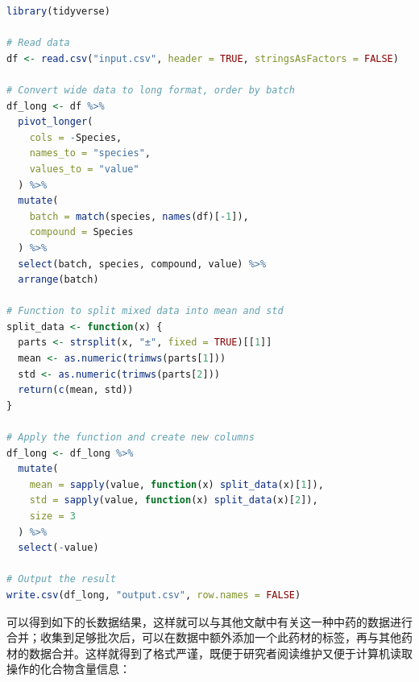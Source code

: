\begin{lstlisting}[language=R]
library(tidyverse)

# Read data
df <- read.csv("input.csv", header = TRUE, stringsAsFactors = FALSE)

# Convert wide data to long format, order by batch
df_long <- df %>%
  pivot_longer(
    cols = -Species, 
    names_to = "species", 
    values_to = "value"
  ) %>%
  mutate(
    batch = match(species, names(df)[-1]),
    compound = Species
  ) %>%
  select(batch, species, compound, value) %>%
  arrange(batch)

# Function to split mixed data into mean and std
split_data <- function(x) {
  parts <- strsplit(x, "±", fixed = TRUE)[[1]]
  mean <- as.numeric(trimws(parts[1]))
  std <- as.numeric(trimws(parts[2]))
  return(c(mean, std))
}

# Apply the function and create new columns
df_long <- df_long %>%
  mutate(
    mean = sapply(value, function(x) split_data(x)[1]),
    std = sapply(value, function(x) split_data(x)[2]),
    size = 3
  ) %>%
  select(-value)

# Output the result
write.csv(df_long, "output.csv", row.names = FALSE)
\end{lstlisting}

可以得到如下的长数据结果，这样就可以与其他文献中有关这一种中药的数据进行合并；收集到足够批次后，可以在数据中额外添加一个此药材的标签，再与其他药材的数据合并。这样就得到了格式严谨，既便于研究者阅读维护又便于计算机读取操作的化合物含量信息：

